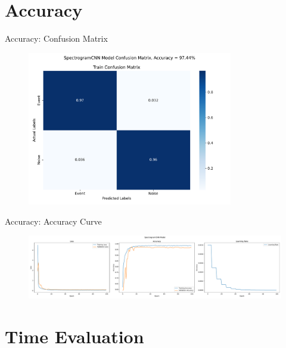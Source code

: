 \documentclass[10pt, xcolor = svgnames]{beamer} %
\begin{document}
\section{Accuracy}



\begin{frame}[fragile]{Accuracy: Confusion Matrix}
\begin{figure}
\centering
\includegraphics[width = 0.8\textwidth]{../Spectrogram_Result/Spectrogram_CM.pdf}
\label{fig1}
\end{figure}
\end{frame}


\begin{frame}[fragile]{Accuracy: Accuracy Curve}
\begin{figure}
\centering
\includegraphics[width = 1.0\textwidth]{../Spectrogram_Result/Spectrogram_Accurracy.pdf}
\label{fig1}
\end{figure}
\end{frame}



\section{Time Evaluation}




\end{document}
